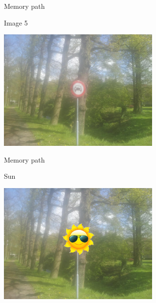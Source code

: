\begin{frame}{Memory path}
  \begin{block}{Image 5}
    \begin{center}
      \includegraphics[height=6cm]{img/loci/05.jpg}
    \end{center}
  \end{block}
\end{frame}
\begin{frame}{Memory path}
  \begin{block}{Sun}
    \begin{center}
      \includegraphics[height=6cm]{img/loci/05-sun.jpg}
    \end{center}
  \end{block}
\end{frame}

